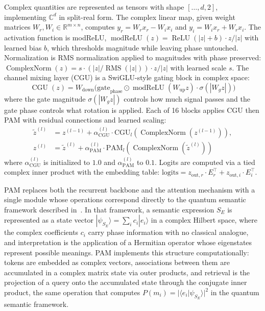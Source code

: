 \documentclass[aps,prl,twocolumn,superscriptaddress,amsmath,amssymb]{revtex4-2}
\newcommand{\Complex}{\mathbb{C}}
\begin{document}
Complex quantities are represented as tensors with shape $[\ldots, d, 2]$, implementing $\Complex^{d}$ in split-real form. The complex linear map, given weight matrices $W_r, W_i \in \mathbb{R}^{m \times n}$, computes $y_r = W_r x_r - W_i x_i$ and $y_i = W_i x_r + W_r x_i$. The activation function is modReLU, $\operatorname{modReLU}(z) = \operatorname{ReLU}(|z| + b) \cdot z / |z|$ with learned bias $b$, which thresholds magnitude while leaving phase untouched. Normalization is RMS normalization applied to magnitudes with phase preserved: $\operatorname{ComplexNorm}(z) = s \cdot (|z| / \operatorname{RMS}(|z|)) \cdot z / |z|$ with learned scale $s$. The channel mixing layer (CGU) is a SwiGLU-style gating block in complex space:
\begin{equation}
  \operatorname{CGU}(z) = W_{\text{down}}\bigl( \mathrm{gate}_{\mathrm{phase}} \odot \operatorname{modReLU}(W_{\text{up}} z) \cdot \sigma(|W_g z|) \bigr)
\end{equation}
where the gate magnitude $\sigma(|W_g z|)$ controls how much signal passes and the gate phase controls what rotation is applied. Each of 16 blocks applies CGU then PAM with residual connections and learned scaling:
\begin{align}
  \tilde{z}^{(l)} &= z^{(l-1)} + \alpha^{(l)}_{\text{CGU}} \cdot \text{CGU}_l(\operatorname{ComplexNorm}(z^{(l-1)})), \\
  z^{(l)} &= \tilde{z}^{(l)} + \alpha^{(l)}_{\text{PAM}} \cdot \text{PAM}_l(\operatorname{ComplexNorm}(\tilde{z}^{(l)}))
\end{align}
where $\alpha^{(l)}_{\text{CGU}}$ is initialized to $1.0$ and $\alpha^{(l)}_{\text{PAM}}$ to $0.1$. Logits are computed via a tied complex inner product with the embedding table: $\text{logits} = z_{\text{out},r} \cdot E_r^\top + z_{\text{out},i} \cdot E_i^\top$.

\label{sec:pam}
PAM replaces both the recurrent backbone and the attention mechanism with a single module whose operations correspond directly to the quantum semantic framework described in~\cite{agostino2025quantum}. In that framework, a semantic expression $S_E$ is represented as a state vector $|\psi_{S_E}\rangle = \sum_i c_i |e_i\rangle$ in a complex Hilbert space, where the complex coefficients $c_i$ carry phase information with no classical analogue, and interpretation is the application of a Hermitian operator whose eigenstates represent possible meanings. PAM implements this structure computationally: tokens are embedded as complex vectors, associations between them are accumulated in a complex matrix state via outer products, and retrieval is the projection of a query onto the accumulated state through the conjugate inner product, the same operation that computes $P(m_i) = |\langle e_i | \psi_{S_E}\rangle|^2$ in the quantum semantic framework.
\end{document}
